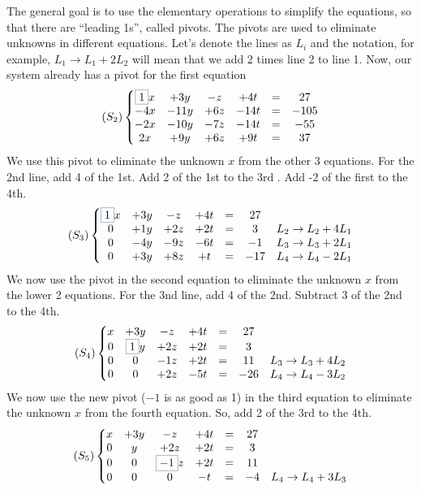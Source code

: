 The general goal is to use the elementary operations to simplify the equations, so that there are ``leading 1s'', called pivots. The pivots are used to eliminate unknowns in different equations. Let's denote the lines as $L_i$ and the notation, for example, $L_1 \to L_1 + 2L_2$ will mean that we add 2 times line 2 to line 1. Now, our system already has a pivot for the first equation
\begin{align*}
(S_2)
\left\{
\begin{matrix}
   \colourboxed{airforceblue}{1}x &+  3y &-  z &+  4t &=&   27 \\
  -4x & -11y & +6z & -14t &=& -105 \\
  -2x & -10y & -7z & -14t &=&  -55 \\
   2x & + 9y & +6z & + 9t &=&   37
\end{matrix}
\right.
\end{align*}
We use this pivot to eliminate the unknown $x$ from the other 3 equations. For the 2nd
line, add 4 of the 1st. Add 2 of the 1st to the 3rd . Add -2 of the first to the 4th.
\begin{align*}
(S_3)
\left\{
\begin{matrix}
   \colourboxed{airforceblue}{1}x & +3y &-  z & +4t &=&   27 & \\
   0  & +1y & +2z & +2t &=&    3 & L_2 \to L_2 + 4L_1\\
   0  & -4y & -9z & -6t &=&   -1 & L_3 \to L_3 + 2L_1\\
   0  & +3y & +8z & + t &=&  -17 & L_4 \to L_4 - 2L_1
\end{matrix}
\right.
\end{align*}
We now use the pivot in the second equation to eliminate the unknown $x$ from the
lower 2 equations. For the 3nd line, add 4 of the 2nd. Subtract 3 of the 2nd to the 4th.
\begin{align*}
(S_4)
\left\{
\begin{matrix}
   x & +3y &-  z & +4t &=&   27 & \\
   0  & \colourboxed{airforceblue}{1}y & +2z & +2t &=& 3 & \\
   0  & 0 & -1z & +2t &=&  11 & L_3 \to L_3 + 4L_2\\
   0  & 0 & +2z & -5t &=& -26 & L_4 \to L_4 - 3L_2
\end{matrix}
\right.
\end{align*}
We now use the new pivot ($-1$ is as good as 1) in the third equation to eliminate the
unknown $x$ from the fourth equation. So, add 2 of the 3rd to the 4th.
\begin{align*}
(S_5)
\left\{
\begin{matrix}
   x & +3y &-  z & +4t &=&   27 & \\
   0  & y & +2z & +2t &=& 3 & \\
   0  & 0 & \colourboxed{airforceblue}{-1}z & +2t &=&  11 & \\
   0  & 0 & 0 & -t &=& -4 & L_4 \to L_4 + 3L_3
\end{matrix}
\right.
\end{align*}
